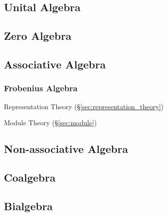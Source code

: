 \subsection{Unital Algebra}\label{sec:unital_algebra}

\subsection{Zero Algebra}\label{sec:zero_algebra}

\subsection{Associative Algebra}\label{sec:associative_algebra}

\subsubsection{Frobenius Algebra}\label{sec:frobenius_algebra}

Representation Theory (\S\ref{sec:representation_theory})

Module Theory (\S\ref{sec:module})



\subsection{Non-associative Algebra}
\label{sec:nonassociative_algebra}

\subsection{Coalgebra}\label{sec:coalgebra}

\subsection{Bialgebra}\label{sec:bialgebra}

